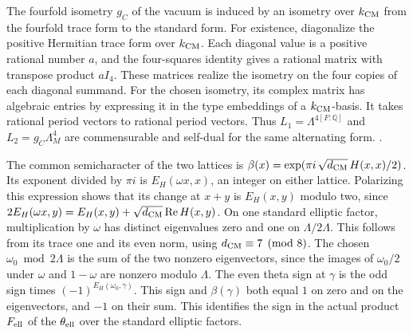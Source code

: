 The fourfold isometry \(g_C\) of the vacuum is induced by an
isometry over \(k_{\rm CM}\) from the fourfold trace form to the
standard form. For existence, diagonalize the positive Hermitian
trace form over \(k_{\rm CM}\). Each diagonal value is a positive
rational number \(a\), and the four-squares identity gives
a rational matrix with transpose product \(a I_4\). These
matrices realize the isometry on the four copies of each
diagonal summand. For the chosen isometry, its complex matrix
has algebraic entries by expressing it in the type embeddings
of a \(k_{\rm CM}\)-basis. It takes rational period vectors
to rational period vectors. Thus
\(L_1=\Lambda^{4[F:\mathbb Q]}\) and \(L_2=g_C\Lambda_M^4\)
are commensurable and self-dual for the same alternating form.
.

The common semicharacter of the two lattices is
\(\beta(x)=\exp(\pi i\,\sqrt{d_{\rm CM}}\,H(x,x)/2)\).
Its exponent divided by \(\pi i\) is \(E_H(\omega x,x)\),
an integer on either lattice. Polarizing this expression
shows that its change at \(x+y\) is \(E_H(x,y)\) modulo two,
since \(2E_H(\omega x,y)=E_H(x,y)+
\sqrt{d_{\rm CM}}\operatorname{Re}H(x,y)\).
On one standard elliptic factor, multiplication by \(\omega\)
has distinct eigenvalues zero and one on \(\Lambda/2\Lambda\).
This follows from its trace one and its even norm, using
\(d_{\rm CM}\equiv7\pmod8\).
The chosen \(\omega_0\bmod 2\Lambda\) is the sum of the two
nonzero eigenvectors, since the images of \(\omega_0/2\) under
\(\omega\) and \(1-\omega\) are nonzero modulo \(\Lambda\).
The even theta sign at
\(\gamma\) is the odd sign times
\((-1)^{E_H(\omega_0,\gamma)}\).
This sign and \(\beta(\gamma)\) both equal \(1\) on zero and
on the eigenvectors, and \(-1\) on their sum. This identifies
the sign in the actual product \(F_{\rm ell}\) of the
\(\theta_{\rm ell}\) over the standard elliptic factors.

